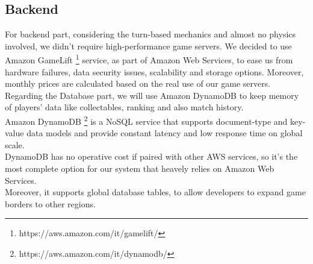 \subsection{Backend}
For backend part, considering the turn-based mechanics and almost no physics involved, we didn't require high-performance game servers. We decided to use Amazon GameLift \footnote{https://aws.amazon.com/it/gamelift/} service, as part of Amazon Web Services, to ease us from hardware failures, data security issues, scalability and storage options. Moreover, monthly prices are calculated based on the real use of our game servers.\\
Regarding the Database part, we will use Amazon DynamoDB to keep memory of players’ data like collectables, ranking and also match history.\\
Amazon DynamoDB \footnote{https://aws.amazon.com/it/dynamodb/} is a NoSQL service that supports document-type and key-value data models and provide constant latency and low response time on global scale.\\
DynamoDB has no operative cost if paired with other AWS services, so it's the most complete option for our system that heavely relies on Amazon Web Services.\\
Moreover, it supports global database tables, to allow developers to expand game borders to other regions.
